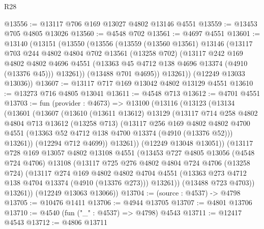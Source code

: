 \begin{lexlean}{R28}
\begin{coremodule}
@13556 := @13117 @706 @169 @13027 @4802 @13146 @4551
@13559 := @13453 @705 @4805 @13026
@13560 := @4548 @702
@13561 := @4697 @4551
@13601 := @13140
    (@13151
      (@13550
        (@13556
          (@13559
            (@13560 @13561)
            @13146
            (@13117
              @703
              @244
              @4802
              @4804
              @702
              @13561
              (@13258 @702)
              (@13117
                @242
                @169
                @4802
                @4802
                @4696
                @4551
                (@13363 @45 @4712 @138 @4696 @13374 (@4910 (@13376 @45)))
                @13261))
            (@13488 @701 @4695))
          @13261))
      (@12249 @13033 @13036))
@13607 := @13117 @717 @169 @13042 @4802 @13129 @4551
@13610 := @13273 @716 @4805 @13041
@13611 := @4548 @713
@13612 := @4701 @4551
@13703 := fun (provider : @4673) =>
  @13100
    (@13116
      (@13123
        (@13134
          (@13601
            (@13607
              (@13610
                (@13611 @13612)
                @13129
                (@13117
                  @714
                  @258
                  @4802
                  @4804
                  @713
                  @13612
                  (@13258 @713)
                  (@13117
                    @256
                    @169
                    @4802
                    @4802
                    @4700
                    @4551
                    (@13363 @52 @4712 @138 @4700 @13374 (@4910 (@13376 @52)))
                    @13261))
                (@12294 @712 @4699))
              @13261))
          (@12249 @13048 @13051))
        (@13117
          @728
          @169
          @13057
          @4802
          @13108
          @4551
          (@13453
            @727
            @4805
            @13056
            (@4548 @724 @4706)
            @13108
            (@13117
              @725
              @276
              @4802
              @4804
              @724
              @4706
              (@13258 @724)
              (@13117
                @274
                @169
                @4802
                @4802
                @4704
                @4551
                (@13363 @273 @4712 @138 @4704 @13374 (@4910 (@13376 @273)))
                @13261))
            (@13488 @723 @4703))
          @13261))
      (@12249 @13063 @13066))
@13704 := (source : @4537) -> @4798
@13705 := @10476 @1411
@13706 := @4944 @13705
@13707 := @4801 @13706
@13710 := @4540 (fun ("_" : @4537) => @4798) @4543
@13711 := @12417 @4543
@13712 := @4806 @13711

\end{coremodule}
\end{lexlean}
